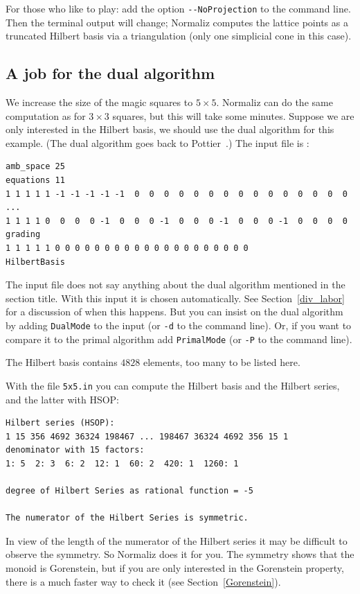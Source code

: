 For those who like to play: add the option \verb|--NoProjection| to the command line. Then the terminal output will change; Normaliz computes the lattice points as a truncated Hilbert basis via a triangulation (only one simplicial cone in this case).

\subsection{A job for the dual algorithm}\label{job_dual}

We increase the size of the magic squares to $5\times 5$. Normaliz can do the same computation as for $3\times 3$ squares, but this will take some minutes. Suppose we are only interested in the Hilbert basis, we should use the dual algorithm for this example. (The dual algorithm goes back to Pottier~\cite{Po}.) The input file is :

\begin{Verbatim}
amb_space 25
equations 11
1 1 1 1 1 -1 -1 -1 -1 -1  0  0  0  0  0  0  0  0  0  0  0  0  0  0  0
...
1 1 1 1 0  0  0  0 -1  0  0  0 -1  0  0  0 -1  0  0  0 -1  0  0  0  0
grading
1 1 1 1 1 0 0 0 0 0 0 0 0 0 0 0 0 0 0 0 0 0 0 0 0
HilbertBasis
\end{Verbatim}
The input file does not say anything about the dual algorithm mentioned in the section title. With this input it is chosen automatically. See Section~\ref{div_labor} for a discussion of when this happens. But you can insist on the dual algorithm by adding \verb|DualMode| to the input (or \verb|-d| to the command line). Or, if you want to compare it to the primal algorithm add \verb|PrimalMode| (or \verb|-P| to the command line).


The Hilbert basis contains $4828$ elements, too many to be listed here.

With the file \verb|5x5.in| you can compute the Hilbert basis and the Hilbert series, and the latter with HSOP:
\begin{Verbatim}
Hilbert series (HSOP):
1 15 356 4692 36324 198467 ... 198467 36324 4692 356 15 1 
denominator with 15 factors:
1: 5  2: 3  6: 2  12: 1  60: 2  420: 1  1260: 1  

degree of Hilbert Series as rational function = -5

The numerator of the Hilbert Series is symmetric.
\end{Verbatim}
In view of the length of the numerator of the Hilbert series it may be difficult to observe the symmetry. So Normaliz does it for you. The symmetry shows that the monoid is Gorenstein, but if you are only interested in the Gorenstein property, there is a much faster way to check it (see Section~\ref{Gorenstein}).

